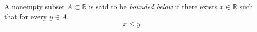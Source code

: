 A nonempty subset $A \subset \mathbb{R}$ is said to be \textit{bounded below} if there exists $x \in \mathbb{R}$ such that for every $y \in A$,
\begin{equation*}
x \leq y.
\end{equation*}
